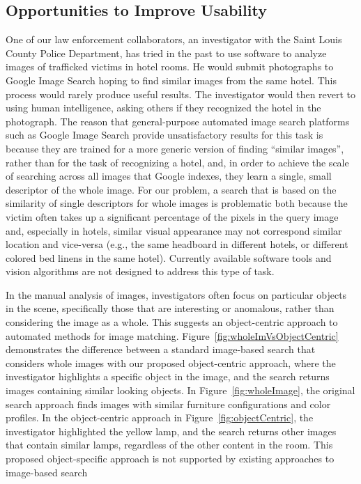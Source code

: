 \documentclass[12pt]{article}
\begin{document}
\subsection{Opportunities to Improve Usability}
One of our law enforcement collaborators, an investigator with the Saint Louis County Police Department, has tried in the past to use software to analyze images of trafficked victims in hotel rooms. He would submit photographs to Google Image Search hoping to find similar images from the same hotel. This process would rarely produce useful results. The investigator would then revert to using human intelligence, asking others if they recognized the hotel in the photograph. The reason that general-purpose automated image search platforms such as Google Image Search provide unsatisfactory results for this task is because they are trained for a more generic version of finding ``similar images'', rather than for the task of recognizing a hotel, and, in order to achieve the scale of searching across all images that Google indexes, they learn a single, small descriptor of the whole image.  For our problem, a search that is based on the similarity of single descriptors for whole images is problematic both because the victim often takes up a significant percentage of the pixels in the query image and, especially in hotels, similar visual appearance may not correspond similar location and vice-versa (e.g., the same headboard in different hotels, or different colored bed linens in the same hotel). Currently available software tools and vision algorithms are not designed to address this type of task. 

In the manual analysis of images, investigators often focus on particular objects in the scene, specifically those that are interesting or anomalous, rather than considering the image as a whole. This suggests an object-centric approach to automated methods for image matching. Figure~\ref{fig:wholeImVsObjectCentric} demonstrates the difference between a standard image-based search that considers whole images with our proposed object-centric approach, where the investigator highlights a specific object in the image, and the search returns images containing similar looking objects. In Figure~\ref{fig:wholeImage}, the original search approach finds images with similar furniture configurations and color profiles. In the object-centric approach in Figure~\ref{fig:objectCentric}, the investigator highlighted the yellow lamp, and the search returns other images that contain similar lamps, regardless of the other content in the room. This proposed object-specific approach is not supported by existing approaches to image-based search
\end{document}
